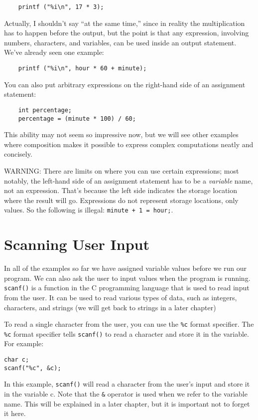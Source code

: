 \begin{verbatim}
    printf ("%i\n", 17 * 3);
\end{verbatim}
%
Actually, I shouldn't say ``at the same time,'' since in reality
the multiplication has to happen before the output, but
the point is that any expression, involving numbers, characters,
and variables, can be used inside an output statement.  We've
already seen one example:

\begin{verbatim}
    printf ("%i\n", hour * 60 + minute);
\end{verbatim}
%
You can also put arbitrary expressions on the right-hand
side of an assignment statement:

\begin{verbatim}
    int percentage;
    percentage = (minute * 100) / 60;
\end{verbatim}
%
This ability may not seem so impressive now, but we will see
other examples where composition makes it possible
to express complex computations neatly and concisely.

WARNING: There are limits on where you can use certain
expressions; most notably, the left-hand side of an assignment
statement has to be a {\em variable} name, not an expression.
That's because the left side indicates the storage location
where the result will go.  Expressions
do not represent storage locations, only values.  So the
following is illegal:  {\tt minute + 1 = hour;}.


\section{Scanning User Input}
In all of the examples so far we have assigned variable values before we run our program. 
We can also ask the user to input values when the program is running. 
 {\tt scanf()} is a function in the C programming language that is used to read input from the user.
  It can be used to read various types of data, such as integers, characters, and strings (we will get back to strings in a later chapter)
 
To read a single character from the user, you can use the  {\tt \%c} 
format specifier. The {\tt \%c} format specifier tells {\tt scanf()} to read a 
character and store it in the variable. For example:
\begin{verbatim}
char c;
scanf("%c", &c);
\end{verbatim}
%

In this example, {\tt scanf()} will read a character from the user's input and store it in the variable c. Note that the {\tt \&} operator is used when we refer to the variable name. This will be explained in a later chapter, but it is important not to forget it here.

